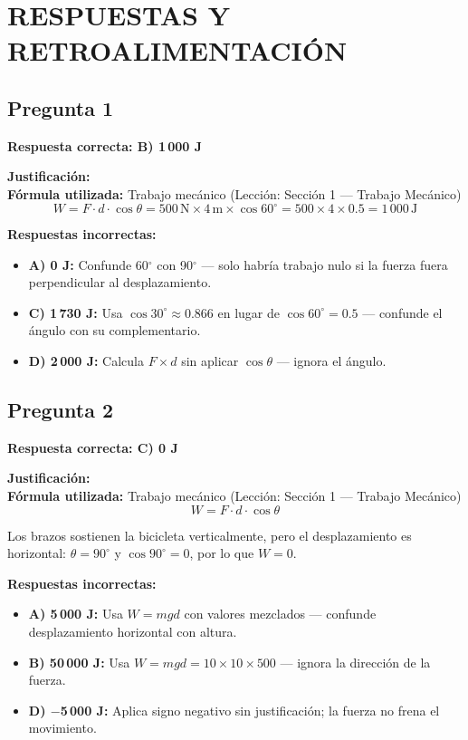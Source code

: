 
\newpage
\onecolumn
\section{RESPUESTAS Y RETROALIMENTACIÓN}

\begin{respuestabox}
\subsection{Pregunta 1}
\textcolor{verdecorrecto}{\textbf{Respuesta correcta: B) 1\,000 J}}

\textbf{Justificación:}\\
\textbf{Fórmula utilizada:} Trabajo mecánico (Lección: Sección 1 --- Trabajo Mecánico)
$$W = F \cdot d \cdot \cos\theta = 500\,\text{N} \times 4\,\text{m} \times \cos 60^\circ = 500 \times 4 \times 0.5 = 1\,000\,\text{J}$$

\textbf{Respuestas incorrectas:}
\begin{itemize}
    \item \textbf{A) 0 J:} Confunde 60$^\circ$ con 90$^\circ$ --- solo habría trabajo nulo si la fuerza fuera perpendicular al desplazamiento.
    \item \textbf{C) 1\,730 J:} Usa $\cos 30^\circ \approx 0.866$ en lugar de $\cos 60^\circ = 0.5$ --- confunde el ángulo con su complementario.
    \item \textbf{D) 2\,000 J:} Calcula $F \times d$ sin aplicar $\cos\theta$ --- ignora el ángulo.
\end{itemize}
\end{respuestabox}

\begin{respuestabox}
\subsection{Pregunta 2}
\textcolor{verdecorrecto}{\textbf{Respuesta correcta: C) 0 J}}

\textbf{Justificación:}\\
\textbf{Fórmula utilizada:} Trabajo mecánico (Lección: Sección 1 --- Trabajo Mecánico)
$$W = F \cdot d \cdot \cos\theta$$

Los brazos sostienen la bicicleta verticalmente, pero el desplazamiento es horizontal: $\theta = 90^\circ$ y $\cos 90^\circ = 0$, por lo que $W = 0$.

\textbf{Respuestas incorrectas:}
\begin{itemize}
    \item \textbf{A) 5\,000 J:} Usa $W = mgd$ con valores mezclados --- confunde desplazamiento horizontal con altura.
    \item \textbf{B) 50\,000 J:} Usa $W = mgd = 10 \times 10 \times 500$ --- ignora la dirección de la fuerza.
    \item \textbf{D) $-$5\,000 J:} Aplica signo negativo sin justificación; la fuerza no frena el movimiento.
\end{itemize}
\end{respuestabox}

